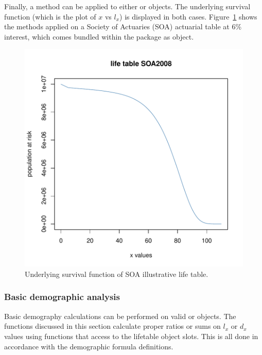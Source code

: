 \documentclass[nojss]{jss}
\begin{document}
Finally, a  method can be applied to either or
 objects. The underlying survival function (which is the plot of $x$ vs $l_x$) is displayed in both cases. 
Figure~\ref{fig:SoaLt} shows the  methods applied on a Society of
Actuaries (SOA) actuarial table at 6\% interest, which comes bundled within the
 package as  object.



\begin{figure}
\begin{center}
\includegraphics{an_introduction_to_lifecontingencies_package-figSurvivalFunction}
\caption{Underlying survival function of SOA illustrative life table.}
\label{fig:SoaLt}
\end{center}
\end{figure}

\clearpage

\subsubsection{Basic demographic analysis}\label{sss:demograph}

Basic demography calculations can be performed on 
valid  or  objects. The functions discussed in this section calculate proper ratios or sums on $l_x$ or $d_x$ values using functions that access to the lifetable object slots. This is all done in accordance with the demographic formula definitions.\\
\end{document}
